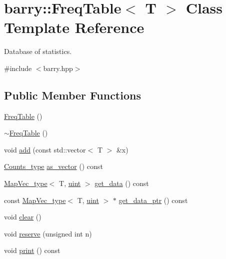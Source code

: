 \hypertarget{classbarry_1_1_freq_table}{}\section{barry\+:\+:Freq\+Table$<$ T $>$ Class Template Reference}
\label{classbarry_1_1_freq_table}


Database of statistics.  




{\ttfamily \#include $<$barry.\+hpp$>$}

\subsection*{Public Member Functions}
\begin{DoxyCompactItemize}
\item 
\hyperlink{classbarry_1_1_freq_table_aea4b22f8097950c3d78e81ab2ed38ae1}{Freq\+Table} ()
\item 
\hyperlink{classbarry_1_1_freq_table_a420a7e4e6740ed7f2b0db1a238f53713}{$\sim$\+Freq\+Table} ()
\item 
void \hyperlink{classbarry_1_1_freq_table_a919e08556ba3aa9535a64827315bb89a}{add} (const std\+::vector$<$ T $>$ \&x)
\item 
\hyperlink{namespacebarry_a3e2d8c3b6cf602107559d4237d9f1315}{Counts\+\_\+type} \hyperlink{classbarry_1_1_freq_table_a1898e62605d8753e170189936d403e05}{as\+\_\+vector} () const
\item 
\hyperlink{namespacebarry_a2f0d3aab1d67e4c8eaeab9022e16139f}{Map\+Vec\+\_\+type}$<$ T, \hyperlink{namespacebarry_a11dfc53ddb4672278319aa04f1e09a6c}{uint} $>$ \hyperlink{classbarry_1_1_freq_table_a7b99496d1c2f4193654752856b30d1a5}{get\+\_\+data} () const
\item 
const \hyperlink{namespacebarry_a2f0d3aab1d67e4c8eaeab9022e16139f}{Map\+Vec\+\_\+type}$<$ T, \hyperlink{namespacebarry_a11dfc53ddb4672278319aa04f1e09a6c}{uint} $>$ $\ast$ \hyperlink{classbarry_1_1_freq_table_ab5dd6677f52072c93d18b2b9a3369ae7}{get\+\_\+data\+\_\+ptr} () const
\item 
void \hyperlink{classbarry_1_1_freq_table_a326660096e4309780aea8355d0f74ac7}{clear} ()
\item 
void \hyperlink{classbarry_1_1_freq_table_a0bdced25f7c0bee38e073c4654578d19}{reserve} (unsigned int n)
\item 
void \hyperlink{classbarry_1_1_freq_table_a4fe8f5e3b5bf64a1cbaf99deb96298d4}{print} () const
\end{DoxyCompactItemize}


